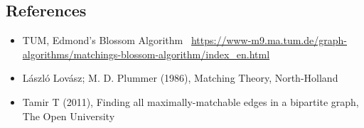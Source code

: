 \documentclass{article}
\begin{document}
\subsection*{References}

\begin{itemize}\itemsep .125cm
	\item TUM, Edmond's Blossom Algorithm ~\url{https://www-m9.ma.tum.de/graph-algorithms/matchings-blossom-algorithm/index_en.html}
	\item László Lovász; M. D. Plummer (1986), Matching Theory, North-Holland
	\item Tamir T (2011), Finding all maximally-matchable edges in a bipartite graph, The Open University
\end{itemize}
\ifx\onefile\undefined
	
\end{document}
